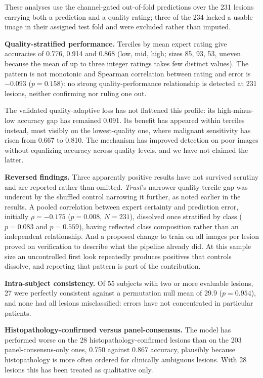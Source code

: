 \documentclass[conference]{IEEEtran}
\begin{document}
\label{sec:robustness}
These analyses use the channel-gated out-of-fold predictions over the 231 lesions carrying both a prediction and a quality rating; three of the 234 lacked a usable image in their assigned test fold and were excluded rather than imputed.

\textbf{Quality-stratified performance.} Terciles by mean expert rating give accuracies of 0.776, 0.914 and 0.868 (low, mid, high; sizes 85, 93, 53, uneven because the mean of up to three integer ratings takes few distinct values). The pattern is not monotonic and Spearman correlation between rating and error is $-0.093$ ($p=0.158$): no strong quality-performance relationship is detected at 231 lesions, neither confirming nor ruling one out.

The validated quality-adaptive loss has not flattened this profile: its high-minus-low accuracy gap has remained 0.091. Its benefit has appeared within terciles instead, most visibly on the lowest-quality one, where malignant sensitivity has risen from 0.667 to 0.810. The mechanism has improved detection on poor images without equalizing accuracy across quality levels, and we have not claimed the latter.

\textbf{Reversed findings.} Three apparently positive results have not survived scrutiny and are reported rather than omitted. \emph{Trust}'s narrower quality-tercile gap was undercut by the shuffled control narrowing it further, as noted earlier in the results. A pooled correlation between expert certainty and prediction error, initially $\rho=-0.175$ ($p=0.008$, $N=231$), dissolved once stratified by class ($p=0.083$ and $p=0.559$), having reflected class composition rather than an independent relationship. And a proposed change to train on all images per lesion proved on verification to describe what the pipeline already did. At this sample size an uncontrolled first look repeatedly produces positives that controls dissolve, and reporting that pattern is part of the contribution.

\textbf{Intra-subject consistency.} Of 55 subjects with two or more evaluable lesions, 27 were perfectly consistent against a permutation null mean of 29.9 ($p=0.954$), and none had all lesions misclassified: errors have not concentrated in particular patients.

\textbf{Histopathology-confirmed versus panel-consensus.} The model has performed worse on the 28 histopathology-confirmed lesions than on the 203 panel-consensus-only ones, 0.750 against 0.867 accuracy, plausibly because histopathology is more often ordered for clinically ambiguous lesions. With 28 lesions this has been treated as qualitative only.
\end{document}
